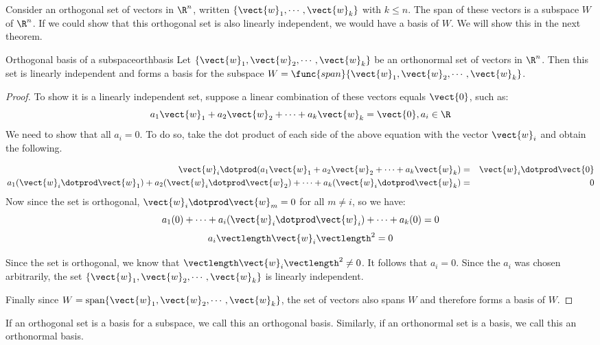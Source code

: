 Consider an orthogonal set of vectors in $\R^n$, written $\{
\vect{w}_1, \cdots, \vect{w}_k \}$ with $k \leq n$. The span of these
vectors is a subspace $W$ of $\R^n$. If we
could show that this orthogonal set is also linearly independent, we
would have a basis of $W$. We will show this in the next theorem.

\begin{theorem}{Orthogonal basis of a subspace}{orthbasis}
Let $ \{ \vect{w}_1, \vect{w}_2, \cdots, \vect{w}_k \}$ be an
orthonormal set of vectors in $\R^n$. Then this set is
linearly independent and forms a basis for the subspace $W =
\func{span} \{ \vect{w}_1, \vect{w}_2, \cdots, \vect{w}_k \}$.
\end{theorem}

\begin{proof}
To show it is a linearly independent set, suppose a linear combination
of these vectors equals $\vect{0}$, such as:
\[
a_1 \vect{w}_1 + a_2 \vect{w}_2 + \cdots + a_k \vect{w}_k = \vect{0}, a_i \in \R 
\]
We need to show that all $a_i = 0$. To do so, take the dot product of
each side of the above equation with the vector $\vect{w}_i$ and obtain the following. 

\begin{eqnarray*}
\vect{w}_i \dotprod (a_1 \vect{w}_1 + a_2 \vect{w}_2 + \cdots + a_k \vect{w}_k ) &=& \vect{w}_i \dotprod \vect{0}\\
a_1 (\vect{w}_i \dotprod \vect{w}_1) + a_2 (\vect{w}_i \dotprod \vect{w}_2) + \cdots + a_k (\vect{w}_i \dotprod \vect{w}_k)  &=& 0 
\end{eqnarray*}
Now since the set is orthogonal, $\vect{w}_i \dotprod \vect{w}_m = 0$ for all $m \neq i$, so we have:
\[
a_1 (0) + \cdots + a_i(\vect{w}_i \dotprod \vect{w}_i) + \cdots + a_k (0) = 0
\]
\[
a_i \vectlength \vect{w}_i \vectlength^2 = 0
\]

Since the set is orthogonal, we know that $\vectlength \vect{w}_i \vectlength^2  \neq 0$. It follows that $a_i =0$. Since the $a_i$ was chosen arbitrarily, the set $\{ \vect{w}_1, \vect{w}_2, \cdots, \vect{w}_k \}$ is linearly independent. 

Finally since $W = \mbox{span} \{ \vect{w}_1, \vect{w}_2, \cdots,
\vect{w}_k \}$, the set of vectors also spans $W$ and therefore forms a basis of $W$. 

\end{proof}

If an orthogonal set is a basis for a subspace, we call this an
orthogonal basis. Similarly, if an orthonormal set is a basis, we call
this an orthonormal basis.

